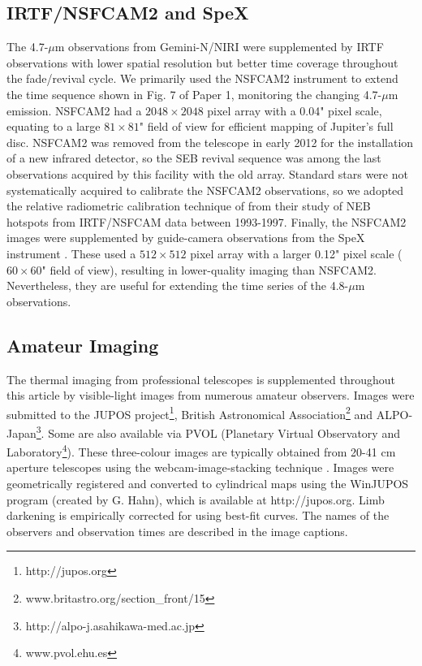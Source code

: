 \documentclass[final,authoryear,5p,times,twocolumn]{elsarticle}
\begin{document}
\subsection{IRTF/NSFCAM2 and SpeX}
The 4.7-$\mu$m observations from Gemini-N/NIRI were supplemented by IRTF observations with lower spatial resolution but better time coverage throughout the fade/revival cycle.  We primarily used the NSFCAM2 instrument \citep{94shure} to extend the time sequence shown in Fig. 7 of Paper 1, monitoring the changing 4.7-$\mu$m emission.  NSFCAM2 had a $2048\times2048$ pixel array with a 0.04" pixel scale, equating to a large $81\times81$" field of view for efficient mapping of Jupiter's full disc.  NSFCAM2 was removed from the telescope in early 2012 for the installation of a new infrared detector, so the SEB revival sequence was among the last observations acquired by this facility with the old array.  Standard stars were not systematically acquired to calibrate the NSFCAM2 observations, so we adopted the relative radiometric calibration technique of \citet{98ortiz} from their study of NEB hotspots from IRTF/NSFCAM data between 1993-1997.  Finally, the NSFCAM2 images were supplemented by guide-camera observations from the SpeX instrument \citep{03rayner}.  These used a $512\times512$ pixel array with a larger 0.12" pixel scale ($60\times60$" field of view), resulting in lower-quality imaging than NSFCAM2.  Nevertheless, they are useful for extending the time series of the 4.8-$\mu$m observations.

\subsection{Amateur Imaging}
The thermal imaging from professional telescopes is supplemented throughout this article by visible-light images from numerous amateur observers.  Images were submitted to the JUPOS project\footnote{\mbox{http://jupos.org}}, British Astronomical Association\footnote{\mbox{www.britastro.org/section\_front/15}} and ALPO-Japan\footnote{\mbox{http://alpo-j.asahikawa-med.ac.jp}}.  Some are also available via PVOL (Planetary Virtual Observatory and Laboratory\footnote{\mbox{www.pvol.ehu.es}}).  These three-colour images are typically obtained from 20-41 cm aperture telescopes using the webcam-image-stacking technique \citep{14mousis_proam, 15kardasis}.  Images were geometrically registered and converted to cylindrical maps using the WinJUPOS program (created by G. Hahn), which is available at \mbox{http://jupos.org}.  Limb darkening is empirically corrected for using best-fit curves. The names of the observers and observation times are described in the image captions.
\end{document}
